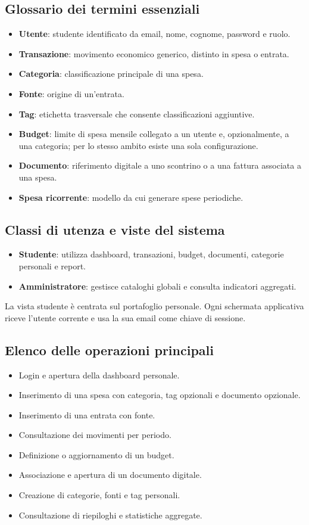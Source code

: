 \documentclass[11pt,a4paper]{article}
\begin{document}
\subsection{Glossario dei termini essenziali}
\begin{itemize}
    \item \textbf{Utente}: studente identificato da email, nome, cognome, password e ruolo.
    \item \textbf{Transazione}: movimento economico generico, distinto in spesa o entrata.
    \item \textbf{Categoria}: classificazione principale di una spesa.
    \item \textbf{Fonte}: origine di un'entrata.
    \item \textbf{Tag}: etichetta trasversale che consente classificazioni aggiuntive.
    \item \textbf{Budget}: limite di spesa mensile collegato a un utente e, opzionalmente, a una categoria; per lo stesso ambito esiste una sola configurazione.
    \item \textbf{Documento}: riferimento digitale a uno scontrino o a una fattura associata a una spesa.
    \item \textbf{Spesa ricorrente}: modello da cui generare spese periodiche.
\end{itemize}

\subsection{Classi di utenza e viste del sistema}
\begin{itemize}
    \item \textbf{Studente}: utilizza dashboard, transazioni, budget, documenti, categorie personali e report.
    \item \textbf{Amministratore}: gestisce cataloghi globali e consulta indicatori aggregati.
\end{itemize}
La vista studente è centrata sul portafoglio personale. Ogni schermata applicativa riceve l'utente corrente e usa la sua email come chiave di sessione.

\subsection{Elenco delle operazioni principali}
\begin{itemize}
    \item Login e apertura della dashboard personale.
    \item Inserimento di una spesa con categoria, tag opzionali e documento opzionale.
    \item Inserimento di una entrata con fonte.
    \item Consultazione dei movimenti per periodo.
    \item Definizione o aggiornamento di un budget.
    \item Associazione e apertura di un documento digitale.
    \item Creazione di categorie, fonti e tag personali.
    \item Consultazione di riepiloghi e statistiche aggregate.
\end{itemize}
\end{document}
